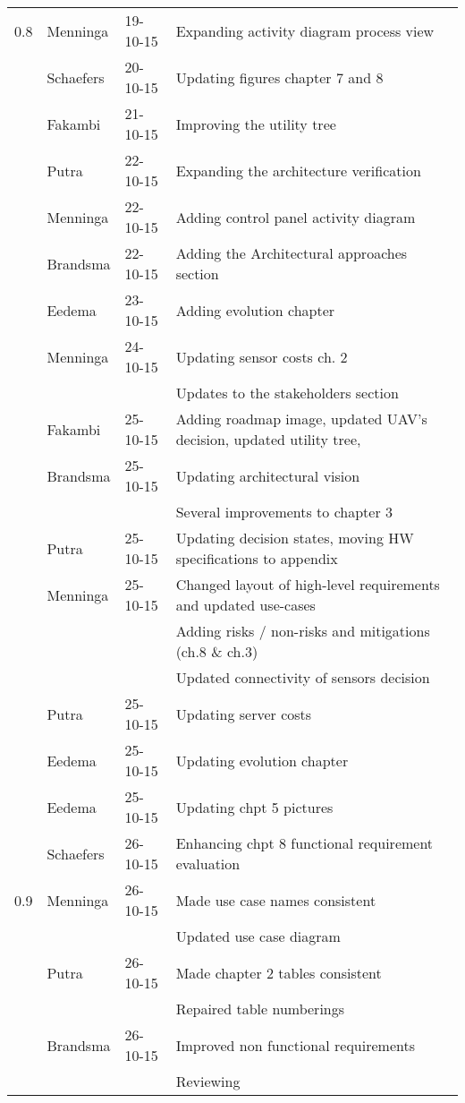 \begin{longtable}{L{} L{} L{} L{}}
	\midrule                 
	0.8				& Menninga		& 19-10-15 & Expanding activity diagram process view \\
					& Schaefers     & 20-10-15 & Updating figures chapter 7 and 8 \\
					& Fakambi		& 21-10-15 & Improving the utility tree \\
					& Putra			& 22-10-15 & Expanding the architecture verification \\
					& Menninga		& 22-10-15 & Adding control panel activity diagram \\
					& Brandsma		& 22-10-15 & Adding the Architectural approaches section \\
					& Eedema		& 23-10-15 & Adding evolution chapter \\
					& Menninga		& 24-10-15 & Updating sensor costs ch. 2 \\
					&				&		   & Updates to the stakeholders section \\
					& Fakambi		& 25-10-15 & Adding roadmap image, updated UAV's decision, updated utility tree, \\
					& Brandsma		& 25-10-15 & Updating architectural vision \\
					&				&		   & Several improvements to chapter 3 \\
					& Putra			& 25-10-15 & Updating decision states, moving HW specifications to appendix \\
					& Menninga		& 25-10-15 & Changed layout of high-level requirements and updated use-cases \\
					&				&		   & Adding risks / non-risks and mitigations (ch.8 \& ch.3) \\
					& 				&		   & Updated connectivity of sensors decision \\
					& Putra			& 25-10-15 & Updating server costs \\
					& Eedema		& 25-10-15 & Updating evolution chapter \\
					& Eedema		& 25-10-15 & Updating chpt 5 pictures \\
					& Schaefers		& 26-10-15 & Enhancing chpt 8 functional requirement evaluation\\
					\midrule  
	0.9				& Menninga		& 26-10-15 & Made use case names consistent \\
					& 				&		   & Updated use case diagram \\
					& Putra			& 26-10-15 & Made chapter 2 tables consistent \\
					&				&		   & Repaired table numberings \\
					& Brandsma		& 26-10-15 & Improved non functional requirements \\
					&				&		   & Reviewing \\
	\midrule  
	

\end{longtable}
